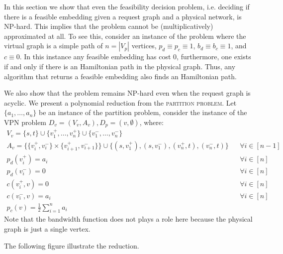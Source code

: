 In this section we show that even the feasibility decision problem, 
i.e. deciding if there is a feasible embedding given a request graph and a
physical network, 
is NP-hard.
This implies that the problem cannot be (multiplicatively) approximated at all.  
To see this, 
consider an instance of the problem where the virtual graph is a simple path of 
$n = |V_p|$ vertices, 
$p_d \equiv p_c \equiv 1$, 
$b_d \equiv b_c \equiv 1$,
and $c \equiv 0$.
In this instance any feasible embedding has cost 0, 
furthermore, 
one exists if and only if there is an Hamiltonian path in the physical graph.
Thus, any algorithm that returns a feasible embedding also finds an Hamiltonian path.

We also show that the problem remains NP-hard even when the request graph is
acyclic.
We present a polynomial reduction from the \textsc{partition problem}.
Let $\{a_1, \ldots, a_n\}$ be an instance of the partition problem, 
consider the instance of the VPN problem 
$D_v = (V_v, A_v), D_p = ({v}, \emptyset)$, 
where:
\begin{align}
V_v = \{s, t\} \cup \{v_1^+, \ldots, v_n^+\} \cup \{v_1^-, \ldots, v_n^-\}
\\
A_v = \{\{v_i^+, v_i^-\} \times \{v_{i + 1}^+, v_{i + 1}^-\}\} 
\cup \{(s, v_1^+), (s, v_1^-), (v_n^+, t), (v_n^-, t)\}
&&
\forall i \in [n-1]
\\
p_d(v_i^+) = a_i && \forall i \in [n]
\\
p_d(v_i^-) = 0 && \forall i \in [n]
\\
c(v_i^+, v) = 0 && \forall i \in [n]
\\
c(v_i^-, v) = a_i && \forall i \in [n] 
\\
p_c(v) = \frac{1}{2}\sum_{i = 1}^n a_i
\end{align}
Note that the bandwidth function does not plays a role here because the physical graph
is just a single vertex.

The following figure illustrate the reduction.
\begin{figure}[ht]
\centering

\end{figure}


